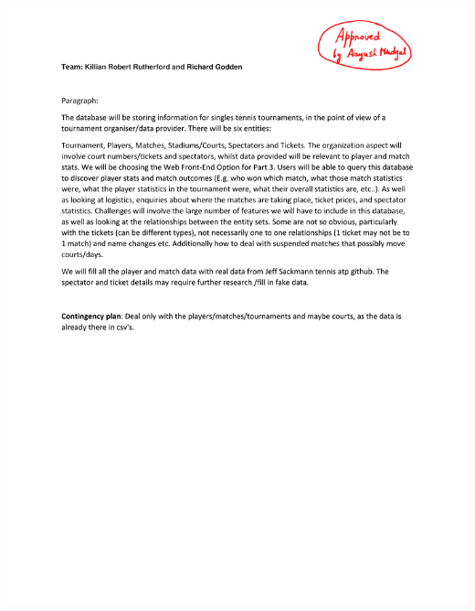 \documentclass[11pt]{article}
\begin{document}
\includegraphics[width=1\textwidth]{killian_richard-1.png}
\end{document}
